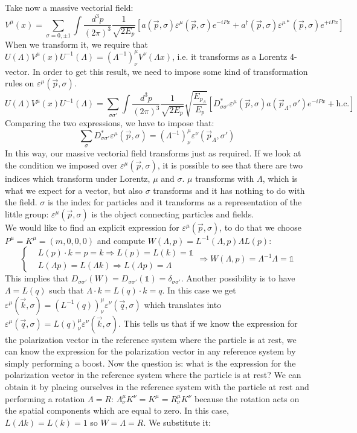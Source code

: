 \documentclass[../main.tex]{subfiles}
\begin{document}
Take now a massive vectorial field:
\[
V^\mu(x)=\sum_{\sigma=0,\pm1}\int\frac{d^3p}{(2\pi)^3}\frac{1}{\sqrt{2E_p}}\left[a(\vec{p},\sigma)\varepsilon^\mu(\vec{p},\sigma)e^{-iPx}+a^\dagger(\vec{p},\sigma)\varepsilon^{\mu*}(\vec{p},\sigma)e^{+iPx}\right]
\]
When we transform it, we require that $U(\Lambda)V^\mu(x)U^{-1}(\Lambda)=(\Lambda^{-1})^\mu_\nu V^\nu(\Lambda x)$, i.e. it transforms as a Lorentz 4-vector. In order to get this result, we need to impose some kind of transformation rules on $\varepsilon^\mu(\vec{p},\sigma)$.
\[
U(\Lambda)V^\mu(x)U^{-1}(\Lambda)=\sum_{\sigma\sigma'}\int\frac{d^3p}{(2\pi)^3}\frac{1}{\sqrt{2E_p}}\sqrt{\frac{E_{p_\Lambda}}{E_p}}\left[D_{\sigma\sigma'}^*\varepsilon^\mu(\vec{p},\sigma)a(\vec{p}_\Lambda,\sigma')e^{-iPx}+\text{h.c.}\right]
\]
Comparing the two expressions, we have to impose that:
\[
\sum_\sigma D_{\sigma\sigma'}^*\varepsilon^\mu(\vec{p},\sigma)=(\Lambda^{-1})^\mu_\nu\varepsilon^\nu(\vec{p}_\Lambda,\sigma')
\]
In this way, our massive vectorial field transforms just as required.
If we look at the condition we imposed over $\varepsilon^\mu(\vec{p},\sigma)$, it is possible to see that there are two indices which transform under Lorentz, $\mu$ and $\sigma$. $\mu$ transforms with $\Lambda$, which is what we expect for a vector, but also $\sigma$ transforms and it has nothing to do with the field. $\sigma$ is the index for particles and it transforms as a representation of the little group: $\varepsilon^\mu(\vec{p},\sigma)$ is the object connecting particles and fields.\\
We would like to find an explicit expression for $\varepsilon^\mu(\vec{p},\sigma)$, to do that we choose $P^\mu=K^\mu=(m,0,0,0)$ and compute $W(\Lambda,p)=L^{-1}(\Lambda,p)\Lambda L(p)$:
\[
\left\{
\begin{aligned}
&L(p)\cdot k=p=k\Rightarrow L(p)=L(k)=\mathbb{1}\\
&L(\Lambda p)=L(\Lambda k)\Rightarrow L(\Lambda p)=\Lambda
\end{aligned}
\right.
\Rightarrow W(\Lambda,p)=\Lambda^{-1}\Lambda=\mathbb{1}
\]
This implies that $D_{\sigma\sigma'}(W)=D_{\sigma\sigma'}(\mathbb{1})=\delta_{\sigma\sigma'}$. Another possibility is to have $\Lambda=L(q)$ such that $\Lambda\cdot k=L(q)\cdot k=q$. In this case we get\\
$\varepsilon^\mu(\vec{k},\sigma)=(L^{-1}(q))^\mu_\nu\varepsilon^\nu(\vec{q},\sigma)$ which translates into $\varepsilon^\mu(\vec{q},\sigma)=L(q)^\mu_\nu\varepsilon^\nu(\vec{k},\sigma)$. This tells us that if we know the expression for the polarization vector in the reference system where the particle is at rest, we can know the expression for the polarization vector in any reference system by simply performing a boost. Now the question is: what is the expression for the polarization vector in the reference system where the particle is at rest? We can obtain it by placing ourselves in the reference system with the particle at rest and performing a rotation $\Lambda=R$: $\Lambda^\mu_\nu K^\nu=K^\mu=R^\mu_\nu K^\nu$ because the rotation acts on the spatial components which are equal to zero. In this case, $L(\Lambda k)=L(k)=1$ so $W=\Lambda=R$. We substitute it:
\end{document}
